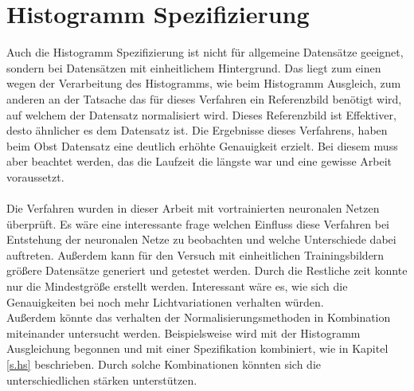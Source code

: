 \section{Histogramm Spezifizierung}
Auch die Histogramm Spezifizierung ist nicht für allgemeine Datensätze geeignet, sondern bei Datensätzen mit einheitlichem Hintergrund. Das liegt zum einen wegen der Verarbeitung des Histogramms, wie beim Histogramm Ausgleich, zum anderen an der Tatsache das für dieses Verfahren ein Referenzbild benötigt wird, auf welchem der Datensatz normalisiert wird. Dieses Referenzbild ist Effektiver, desto ähnlicher es dem Datensatz ist. Die Ergebnisse dieses Verfahrens, haben beim Obst Datensatz eine deutlich erhöhte Genauigkeit erzielt. Bei diesem muss aber beachtet werden, das die Laufzeit die längste war und eine gewisse Arbeit voraussetzt.\\\\
Die Verfahren wurden in dieser Arbeit mit vortrainierten neuronalen Netzen überprüft. Es wäre eine interessante frage welchen Einfluss diese Verfahren bei Entstehung der neuronalen Netze zu beobachten und welche Unterschiede dabei auftreten. Außerdem kann für den Versuch mit einheitlichen Trainingsbildern größere Datensätze generiert und getestet werden. Durch die Restliche zeit konnte nur die Mindestgröße erstellt werden. Interessant wäre es, wie sich die Genauigkeiten bei noch mehr Lichtvariationen verhalten würden.\\
Außerdem könnte das verhalten der Normalisierungsmethoden in Kombination miteinander untersucht werden. Beispielsweise wird mit der Histogramm Ausgleichung begonnen und mit einer Spezifikation kombiniert, wie in Kapitel \ref{s.hs} beschrieben. Durch solche Kombinationen könnten sich die unterschiedlichen stärken unterstützen.  